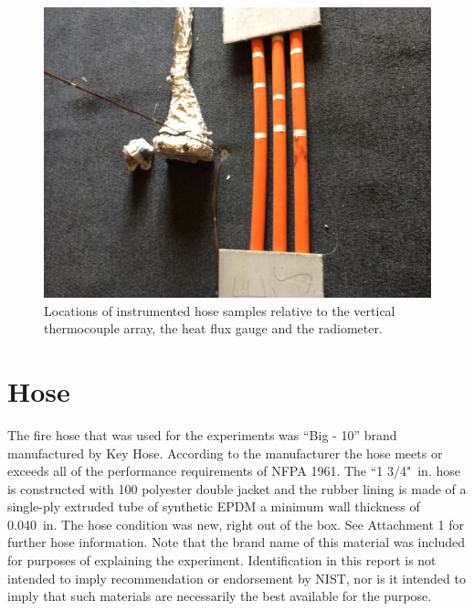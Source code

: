 \documentclass[letterpaper,11pt]{texMemo} %
\begin{document}
\begin{figure}[!ht]
\centering
\includegraphics[width=0.8\columnwidth,angle =-90]{../Figures/Hose_Figures/test_setup_1b}
\caption{Locations of instrumented hose samples relative to the vertical thermocouple array, the heat flux gauge and the radiometer.}
\label{fig:test_setup_1b}
\end{figure}

\section{Hose}
The fire hose that was used for the experiments was ``Big - 10'' brand manufactured by Key Hose. According to the manufacturer the hose meets or exceeds all of the performance requirements of NFPA 1961. The ``1 3/4"~in. hose is constructed with 100 polyester double jacket and the rubber lining is made of a single-ply extruded tube of synthetic EPDM a minimum wall thickness of 0.040~in. The hose condition was new, right out of the box. See Attachment 1 for further hose information. Note that the brand name of this material was included for purposes of explaining the experiment. Identification in this report is not intended to imply recommendation or endorsement by NIST, nor is it intended to imply that such materials are necessarily the best available for the purpose. 

\end{document}
